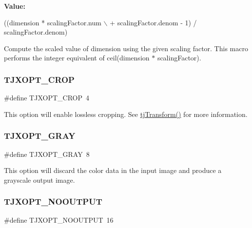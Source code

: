 {\bfseries Value\+:}
\begin{DoxyCode}
((dimension * scalingFactor.num \(\backslash\)
  + scalingFactor.denom - 1) / scalingFactor.denom)
\end{DoxyCode}
Compute the scaled value of {\ttfamily dimension} using the given scaling factor. This macro performs the integer equivalent of {\ttfamily ceil(dimension $\ast$ scaling\+Factor)}. \mbox{\label{group___turbo_j_p_e_g_ga9c771a757fc1294add611906b89ab2d2}} 
\subsubsection{\texorpdfstring{T\+J\+X\+O\+P\+T\+\_\+\+C\+R\+OP}{TJXOPT\_CROP}}
{\footnotesize\ttfamily \#define T\+J\+X\+O\+P\+T\+\_\+\+C\+R\+OP~4}

This option will enable lossless cropping. See \hyperlink{group___turbo_j_p_e_g_gae403193ceb4aafb7e0f56ab587b48616}{tj\+Transform()} for more information. \mbox{\label{group___turbo_j_p_e_g_ga3acee7b48ade1b99e5588736007c2589}} 
\subsubsection{\texorpdfstring{T\+J\+X\+O\+P\+T\+\_\+\+G\+R\+AY}{TJXOPT\_GRAY}}
{\footnotesize\ttfamily \#define T\+J\+X\+O\+P\+T\+\_\+\+G\+R\+AY~8}

This option will discard the color data in the input image and produce a grayscale output image. \mbox{\label{group___turbo_j_p_e_g_gafbf992bbf6e006705886333703ffab31}} 
\subsubsection{\texorpdfstring{T\+J\+X\+O\+P\+T\+\_\+\+N\+O\+O\+U\+T\+P\+UT}{TJXOPT\_NOOUTPUT}}
{\footnotesize\ttfamily \#define T\+J\+X\+O\+P\+T\+\_\+\+N\+O\+O\+U\+T\+P\+UT~16}

